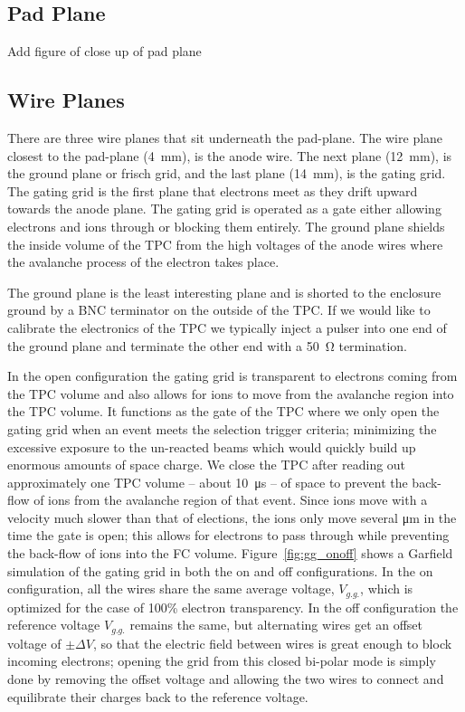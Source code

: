 \subsection{Pad Plane}
Add figure of close up of pad plane 


\subsection{Wire Planes}
There are three wire planes that sit underneath the pad-plane. The wire plane closest to the pad-plane (\SI{4}{\milli\metre}), is the anode wire. The next plane (\SI{12}{\milli\metre}), is the ground plane or frisch grid, and the last plane (\SI{14}{\milli\metre}), is the gating grid. The gating grid is the first plane that electrons meet as they drift upward towards the anode plane. The gating grid is operated as a gate either allowing electrons and ions through or blocking them entirely. The ground plane shields the inside volume of the TPC from the high voltages of the anode wires where the avalanche process of the electron takes place. 

The ground plane is the least interesting plane and is shorted to the enclosure ground by a BNC terminator on the outside of the TPC. If we would like to calibrate the electronics of the TPC we typically inject a pulser into one end of the ground plane and terminate the other end with a \SI{50}{\ohm} termination. 

In the open configuration the gating grid is transparent to electrons coming from the TPC volume and also allows for ions to move from the avalanche region into the TPC volume. It functions as the gate of the TPC where we only open the gating grid when an event meets the selection trigger criteria; minimizing the excessive exposure to the un-reacted beams which would quickly build up enormous amounts of space charge. We close the TPC after reading out approximately one TPC volume -- about \SI{10}{\micro\second}  -- of space to prevent the back-flow of ions from the avalanche region of that event. Since ions move with a velocity much slower than that of elections, the ions only move several \si{\micro\metre} in the time the gate is open; this allows for electrons to pass through while preventing the back-flow of ions into the FC volume. Figure~\ref{fig:gg_onoff} shows a Garfield simulation of the gating grid in both the on and off configurations. In the on configuration, all the wires share the same average voltage, $V_{g.g.}$, which is optimized for the case of 100\% electron transparency. In the off configuration the reference voltage $V_{g.g.}$ remains the same, but alternating wires get an offset voltage of $\pm \Delta V$, so that the electric field between wires is great enough to block incoming electrons; opening the grid from this closed bi-polar mode is simply done by removing the offset voltage and allowing the two wires to connect and equilibrate their charges back to the reference voltage. 


